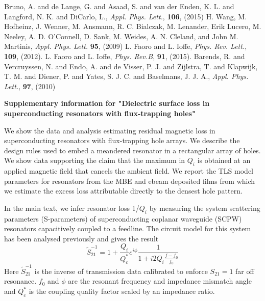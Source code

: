 \documentclass{report}
\begin{document}
\begin{thebibliography}{99}
 Bruno, A. and de Lange, G. and Asaad, S. and van der Enden, K. L. and Langford, N. K. and DiCarlo, L., \textit{Appl. Phys. Lett.}, \textbf{106}, (2015)
 H.  Wang, M.  Hofheinz, J.  Wenner, M.  Ansmann, R. C.  Bialczak, M.  Lenander,  Erik Lucero, M.  Neeley, A. D.  O’Connell, D.  Sank, M.  Weides, A. N.  Cleland, and  John M. Martinis, \textit{Appl. Phys. Lett.} \textbf{95},  (2009)
L. Faoro and L. Ioffe, \textit{Phys. Rev. Lett.}, \textbf{109}, (2012).
L. Faoro and L. Ioffe, \textit{Phys. Rev.B}, \textbf{91}, (2015).
  Barends, R. and Vercruyssen, N. and Endo, A. and de Visser, P. J. and Zijlstra, T. and Klapwijk, T. M. and Diener, P. and Yates, S. J. C. and Baselmans, J. J. A., \textit{Appl. Phys. Lett.}, \textbf{97}, (2010)

\end{thebibliography}

\clearpage
\newcommand{\beginsupplement}{%
        \setcounter{table}{0}
        \renewcommand{\thetable}{S\arabic{table}}%
        \setcounter{figure}{0}
        \renewcommand{\thefigure}{S\arabic{figure}}%
        \setcounter{equation}{0}
        \renewcommand{\theequation}{S\arabic{equation}}%
     }
\beginsupplement
\makeatletter
\makeatother

\begin{center}
\textbf{Supplementary information for "Dielectric surface loss in superconducting resonators with flux-trapping holes"}
\end{center}

\def \Bcapp {\text{B}^{\text{cool}}_{\text{applied}}}

We show the data and analysis estimating residual magnetic loss in superconducting resonators with flux-trapping hole arrays. We describe the design rules used to embed a meandered resonator in a rectangular array of holes.  We show data supporting the claim that the maximum in $Q_{i}$ is obtained at an applied magnetic field that cancels the ambient field.  We report the TLS model parameters for resonators from the MBE and ebeam deposited films from which we estimate the excess loss attributable directly to the densest hole pattern.

In the main text, we infer resonator loss 1/$Q_i$ by measuring the system scattering parameters (S-parameters) of superconducting coplanar waveguide (SCPW) resonators capacitively coupled to a feedline.  The circuit model for this system has been analysed previously \cite{megrant2012} and gives the result 
\begin{equation}
\label{spectroscopyS21}
\tilde{S}_{21}^{-1} = 1 + \frac{Q_{i}}{Q_{c}^{*}}e^{i \phi}\frac{1}{1+i2 Q_{i} \frac{f-f_{0}}{f_{0}}}
\end{equation}
Here $\tilde{S}_{21}^{-1}$ is the inverse of transmission data calibrated to enforce $S_{21}=1$ far off resonance.  $f_{0}$ and $\phi$ are the resonant frequency and impedance mismatch angle and  $Q_{c}^{*}$ is the coupling quality factor scaled by an impedance ratio.
\end{document}
